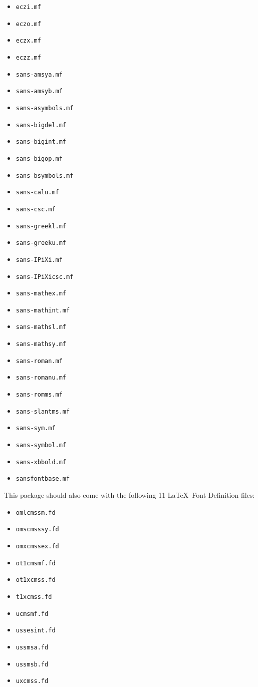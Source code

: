 \documentclass{amsart}
\begin{document}
\begin{itemize}
\item \texttt{eczi.mf}
\item \texttt{eczo.mf}
\item \texttt{eczx.mf}
\item \texttt{eczz.mf}
\item \texttt{sans-amsya.mf}
\item \texttt{sans-amsyb.mf}
\item \texttt{sans-asymbols.mf}
\item \texttt{sans-bigdel.mf}
\item \texttt{sans-bigint.mf}
\item \texttt{sans-bigop.mf}
\item \texttt{sans-bsymbols.mf}
\item \texttt{sans-calu.mf}
\item \texttt{sans-csc.mf}
\item \texttt{sans-greekl.mf}
\item \texttt{sans-greeku.mf}
\item \texttt{sans-IPiXi.mf}
\item \texttt{sans-IPiXicsc.mf}
\item \texttt{sans-mathex.mf}
\item \texttt{sans-mathint.mf}
\item \texttt{sans-mathsl.mf}
\item \texttt{sans-mathsy.mf}
\item \texttt{sans-roman.mf}
\item \texttt{sans-romanu.mf}
\item \texttt{sans-romms.mf}
\item \texttt{sans-slantms.mf}
\item \texttt{sans-sym.mf}
\item \texttt{sans-symbol.mf}
\item \texttt{sans-xbbold.mf}
\item \texttt{sansfontbase.mf}
\end{itemize}

This package should also come with the following 11 \LaTeX\ Font Definition files:

\begin{itemize}
\item \texttt{omlcmssm.fd}
\item \texttt{omscmsssy.fd}
\item \texttt{omxcmssex.fd}

\item \texttt{ot1cmsmf.fd}
\item \texttt{ot1xcmss.fd}
\item \texttt{t1xcmss.fd}

\item \texttt{ucmsmf.fd}
\item \texttt{ussesint.fd}
\item \texttt{ussmsa.fd}
\item \texttt{ussmsb.fd}
\item \texttt{uxcmss.fd}
\end{itemize}
\end{document}
